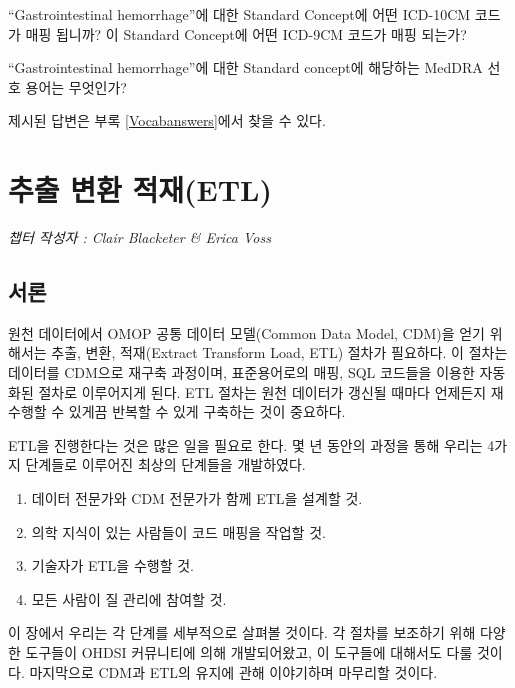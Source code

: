 \documentclass[11pt]{book}
\providecommand{\tightlist}{%
  \setlength{\itemsep}{0pt}\setlength{\parskip}{0pt}}
\theoremstyle{definition}
\theoremstyle{definition}
\theoremstyle{definition}
\theoremstyle{remark}
\let\BeginKnitrBlock\begin \let\EndKnitrBlock\end
\begin{document}
\BeginKnitrBlock{exercise}
\protect\hypertarget{exr:exerciseVocab2}{}{\label{exr:exerciseVocab2}
}``Gastrointestinal hemorrhage''에 대한 Standard Concept에 어떤 ICD-10CM
코드가 매핑 됩니까? 이 Standard Concept에 어떤 ICD-9CM 코드가 매핑
되는가?
\EndKnitrBlock{exercise}

\BeginKnitrBlock{exercise}
\protect\hypertarget{exr:exerciseVocab3}{}{\label{exr:exerciseVocab3}
}``Gastrointestinal hemorrhage''에 대한 Standard concept에 해당하는
MedDRA 선호 용어는 무엇인가?
\EndKnitrBlock{exercise}

제시된 답변은 부록 \ref{Vocabanswers}에서 찾을 수 있다.

\chapter{추출 변환 적재(ETL)}\label{ExtractTransformLoad}

\emph{챕터 작성자 : Clair Blacketer \& Erica Voss}

\section{서론}

원천 데이터에서 OMOP 공통 데이터 모델(Common Data Model, CDM)을 얻기
위해서는 추출, 변환, 적재(Extract Transform Load, ETL) 절차가 필요하다.
이 절차는 데이터를 CDM으로 재구축 과정이며, 표준용어로의 매핑, SQL
코드들을 이용한 자동화된 절차로 이루어지게 된다. ETL 절차는 원천
데이터가 갱신될 때마다 언제든지 재수행할 수 있게끔 반복할 수 있게
구축하는 것이 중요하다.
 
 

ETL을 진행한다는 것은 많은 일을 필요로 한다. 몇 년 동안의 과정을 통해
우리는 4가지 단계들로 이루어진 최상의 단계들을 개발하였다.

\begin{enumerate}
\def\labelenumi{\arabic{enumi}.}
\tightlist
\item
  데이터 전문가와 CDM 전문가가 함께 ETL을 설계할 것.
\item
  의학 지식이 있는 사람들이 코드 매핑을 작업할 것.
\item
  기술자가 ETL을 수행할 것.
\item
  모든 사람이 질 관리에 참여할 것.
\end{enumerate}

이 장에서 우리는 각 단계를 세부적으로 살펴볼 것이다. 각 절차를 보조하기
위해 다양한 도구들이 OHDSI 커뮤니티에 의해 개발되어왔고, 이 도구들에
대해서도 다룰 것이다. 마지막으로 CDM과 ETL의 유지에 관해 이야기하며
마무리할 것이다.
\end{document}
